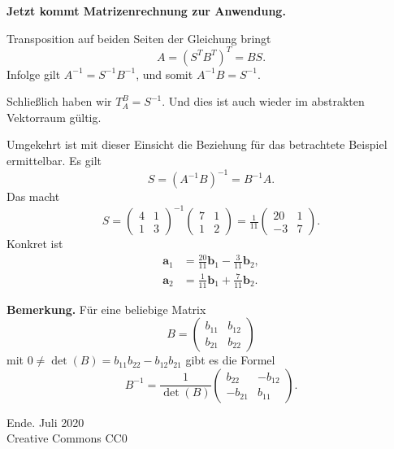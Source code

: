 \documentclass{beamer}
\newcommand{\modest}[1]{{\small\color{gray}#1}}
\newcommand{\bv}[1]{\mathbf{#1}}
\newcommand{\strong}[1]{\textsf{\textbf{#1}}}
\begin{document}
\begin{frame}
\strong{Jetzt kommt Matrizenrechnung zur Anwendung.}\pause

\vspace{1em}
Transposition auf beiden Seiten der Gleichung bringt
\[A = (S^T B^T)^T = BS.\]\pause
Infolge gilt $A^{-1} = S^{-1} B^{-1}$, und somit
$A^{-1}B = S^{-1}.$\pause

\vspace{1em}
Schließlich haben wir $T_A^B=S^{-1}$. Und dies ist auch wieder
im abstrakten Vektorraum gültig.
\end{frame}

\begin{frame}
Umgekehrt ist mit dieser Einsicht die Beziehung für das betrachtete
Beispiel ermittelbar. Es gilt
\[S = (A^{-1}B)^{-1} = B^{-1}A.\]\pause
Das macht
\[S = \begin{pmatrix}4 & 1\\ 1 & 3\end{pmatrix}^{-1}
\begin{pmatrix}7 & 1\\ 1 & 2\end{pmatrix}
= \tfrac{1}{11}\begin{pmatrix}20 & 1\\ -3 & 7\end{pmatrix}.\]
Konkret ist
\begin{align*}
\bv a_1 &= \tfrac{20}{11}\bv b_1 - \tfrac{3}{11}\bv b_2,\\
\bv a_2 &= \tfrac{1}{11}\bv b_1 + \tfrac{7}{11}\bv b_2.
\end{align*}
\end{frame}

\begin{frame}
\strong{Bemerkung.} Für eine beliebige Matrix
\[B = \begin{pmatrix}b_{11} & b_{12}\\ b_{21} & b_{22}\end{pmatrix}\]
mit $0\ne \det(B) = b_{11}b_{22}-b_{12}b_{21}$ gibt es die Formel
\[B^{-1} = \frac{1}{\det(B)}\begin{pmatrix}
 b_{22} & -b_{12}\\
-b_{21} &  b_{11}
\end{pmatrix}.\]
\end{frame}

\begin{frame}
Ende.
\vfill\hfill\modest{Juli 2020}\\
\hfill\modest{Creative Commons CC0}
\end{frame}
\end{document}
